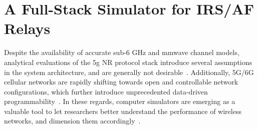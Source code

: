 
\section{A Full-Stack Simulator for IRS/AF Relays}
\label{sec:simulator}

Despite the availability of accurate sub-6 GHz and \gls{mmwave} channel models, analytical evaluations of the \gls{5g} NR protocol stack introduce several assumptions in the system architecture, and are generally not desirable~\cite{gkonis2020comprehensive}. 
Additionally, 5G/6G cellular networks are rapidly shifting towards open and controllable network configurations, which further introduce unprecedented data-driven programmability~\cite{bonati2020open}. 
In these regards, computer simulators are emerging as a valuable tool to let researchers better understand the performance of wireless networks, and dimension them accordingly~\cite{wilhelmi2021usage}.  

